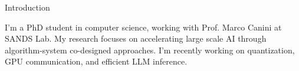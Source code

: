 
\begin{rubric}{Introduction}
\begin{minipage}{0.95\textwidth}
I'm a PhD student in computer science, working with Prof. Marco Canini at SANDS Lab.
My research focuses on accelerating large scale AI through algorithm-system co-designed approaches.
I'm recently working on quantization, GPU communication, and efficient LLM inference.
\end{minipage}
\end{rubric} 